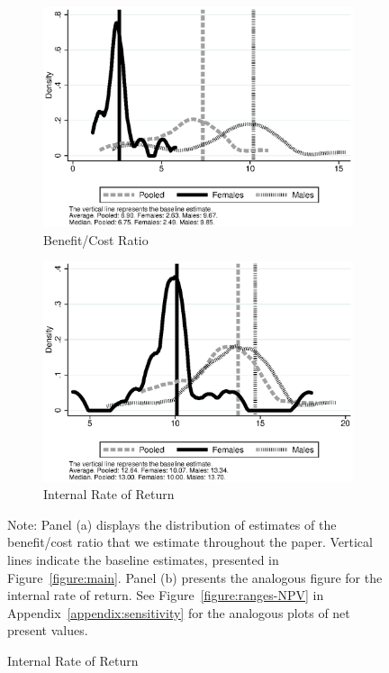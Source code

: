 \begin{figure}
\centering
\caption{Distribution of Benefit/Cost and Internal Rate of Return Estimates}\label{figure:ranges}
\begin{subfigure}[h]{0.49\textwidth}
	\centering
	\caption{Benefit/Cost Ratio} \label{fig:bc}
	\includegraphics[width=\textwidth]{output/overalldist_BCRatio}
\end{subfigure}
\begin{subfigure}[h]{0.49\textwidth}
	\centering
	\caption{Internal Rate of Return} \label{fig:irr}
	\includegraphics[width=\textwidth]{output/overalldist_IRR}
\end{subfigure}%
\footnotesize \justify
Note: Panel (a) displays the distribution of estimates of the benefit/cost ratio that we estimate throughout the paper. Vertical lines indicate the baseline estimates, presented in Figure~\ref{figure:main}. Panel (b) presents the analogous figure for the internal rate of return. See Figure~\ref{figure:ranges-NPV} in Appendix~\ref{appendix:sensitivity} for the analogous plots of net present values. \\
\end{figure}

